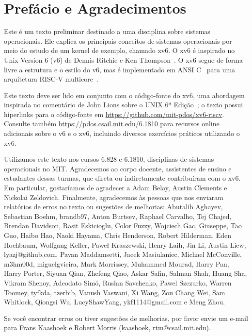 \chapter*{Prefácio e Agradecimentos}

Este é um texto preliminar destinado a uma disciplina sobre sistemas operacionais.  
Ele explica os principais conceitos de sistemas operacionais por meio do estudo de um kernel de exemplo, chamado xv6.  
O xv6 é inspirado no Unix Version 6 (v6) de Dennis Ritchie e Ken Thompson~\cite{unix}.  
O xv6 segue de forma livre a estrutura e o estilo do v6, mas é implementado em ANSI C~\cite{kernighan} para uma arquitetura RISC-V multicore~\cite{riscv}.

Este texto deve ser lido em conjunto com o código-fonte do xv6,  
uma abordagem inspirada no comentário de John Lions sobre o UNIX 6ª Edição~\cite{lions};  
o texto possui hiperlinks para o código-fonte em  
\url{https://github.com/mit-pdos/xv6-riscv}.  
Consulte também  
\url{https://pdos.csail.mit.edu/6.1810}  
para recursos online adicionais sobre o v6 e o xv6, incluindo diversos exercícios práticos utilizando o xv6.

Utilizamos este texto nos cursos 6.828 e 6.1810, disciplinas de sistemas operacionais no MIT.  
Agradecemos ao corpo docente, assistentes de ensino e estudantes dessas turmas, que direta ou indiretamente contribuíram com o xv6.  
Em particular, gostaríamos de agradecer a Adam Belay, Austin Clements e Nickolai Zeldovich.  
Finalmente, agradecemos às pessoas que nos enviaram relatórios de erros no texto ou sugestões de melhorias:  
Abutalib Aghayev, Sebastian Boehm, brandb97, Anton Burtsev, Raphael Carvalho, Tej Chajed, Brendan Davidson, Rasit Eskicioglu, Color Fuzzy, Wojciech Gac, Giuseppe, Tao Guo, Haibo Hao, Naoki Hayama, Chris Henderson, Robert Hilderman, Eden Hochbaum, Wolfgang Keller, Paweł Kraszewski, Henry Laih, Jin Li, Austin Liew, lyazj@github.com, Pavan Maddamsetti, Jacek Masiulaniec, Michael McConville, m3hm00d, miguelgvieira, Mark Morrissey, Muhammed Mourad, Harry Pan, Harry Porter, Siyuan Qian, Zhefeng Qiao, Askar Safin, Salman Shah, Huang Sha, Vikram Shenoy, Adeodato Simó, Ruslan Savchenko, Pawel Szczurko, Warren Toomey, tyfkda, tzerbib, Vanush Vaswani, Xi Wang, Zou Chang Wei, Sam Whitlock, Qiongsi Wu, LucyShawYang, ykf1114@gmail.com e Meng Zhou.

Se você encontrar erros ou tiver sugestões de melhorias, por favor envie um e-mail para  
Frans Kaashoek e Robert Morris (kaashoek, rtm@csail.mit.edu).
